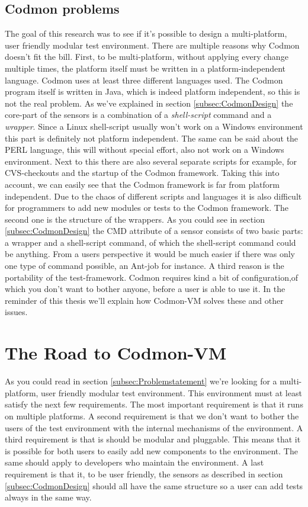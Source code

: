 \documentclass[a4paper,10pt]{scrartcl}
\newcommand{\project}{Codmon-VM}
\begin{document}
\subsection{Codmon problems}
\label{subsec:CodmonProblems}
The goal of this research was to see if it's possible to design a multi-platform, user friendly modular test environment. There are multiple reasons why Codmon doesn't fit the bill. First,
to be multi-platform, without applying every change multiple times, the platform itself must be written in a platform-independent language. Codmon uses at least three 
different languages used. The Codmon program itself is written in Java, which is indeed platform independent\cite{Java}, so this is not the real problem. As we've explained in section \ref{subsec:CodmonDesign} the
core-part of the sensors is a combination of a \emph{shell-script} command and a \emph{wrapper}. Since a Linux shell-script usually won't work on a Windows environment this part is definitely
not platform independent. The same can be said about the PERL language, this will without special effort, also not work on a Windows environment. Next to this there are also several separate
scripts for example, for  CVS-checkouts and the startup of the Codmon framework. Taking this into account, we can easily see that the Codmon framework is far from platform independent. Due to the chaos of 
different scripts and languages it is also difficult for programmers to add new modules or tests to the Codmon framework. The second one is the structure of the wrappers. As you could see in 
section \ref{subsec:CodmonDesign} the CMD attribute of a sensor consists of two basic parts: a wrapper and a shell-script command, of which the shell-script command could be anything. From a users 
perspective it would be much easier if there was only one type of command possible, an Ant-job for instance. A third reason is the portability of the test-framework. Codmon requires kind a bit
of configuration,of which you don't want to bother anyone, before a user is able to use it. In the reminder of this thesis we'll explain how \project{} solves these and other issues. 

\newpage
\section{The Road to \project{}}
\label{sec:road}
As you could read in section \ref{subsec:Problemstatement} we're looking for a multi-platform, user friendly modular test environment. This environment must at least satisfy the next few 
requirements. The most important requirement is that it runs on multiple platforms. A second requirement is that we don't want to bother the users of the test environment with the internal 
mechanisms of the environment. A third requirement is that is should be modular and pluggable. This means that it is possible for both users to easily add new components to the environment. The 
same should apply to developers who maintain the environment. A last requirement is that it, to be user friendly, the sensors as described in section \ref{subsec:CodmonDesign} should all have 
the same structure so a user can add tests always in the same way.\\
\end{document}
